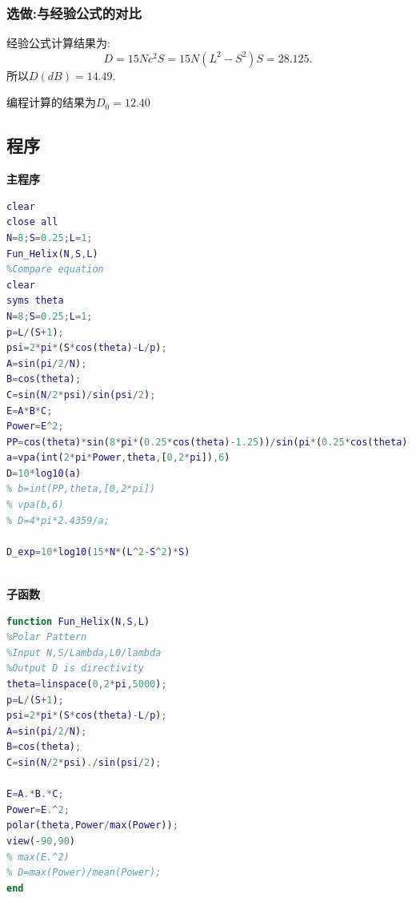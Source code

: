 \subsubsection{选做:与经验公式的对比}
经验公式计算结果为:
\begin{equation}
D=15Nc^2 S=15N(L^2-S^2) S=28.125.
\end{equation}
所以$D(dB)=14.49$.


编程计算的结果为$D_0=12.40$
\subsection{程序}
\noindent \textbf{主程序}
\begin{lstlisting}[language={matlab},keywordstyle=\color{blue!70},commentstyle=\color{red!50!green!50!blue!50},frame=shadowbox, rulesepcolor=\color{red!20!green!20!blue!20}] 
clear
close all
N=8;S=0.25;L=1;
Fun_Helix(N,S,L)
%Compare equation
clear
syms theta
N=8;S=0.25;L=1;
p=L/(S+1);
psi=2*pi*(S*cos(theta)-L/p);
A=sin(pi/2/N);
B=cos(theta);
C=sin(N/2*psi)/sin(psi/2);
E=A*B*C;
Power=E^2;
PP=cos(theta)*sin(8*pi*(0.25*cos(theta)-1.25))/sin(pi*(0.25*cos(theta)-1.225));
a=vpa(int(2*pi*Power,theta,[0,2*pi]),6)
D=10*log10(a)
% b=int(PP,theta,[0,2*pi])
% vpa(b,6)
% D=4*pi*2.4359/a;

D_exp=10*log10(15*N*(L^2-S^2)*S)



\end{lstlisting}
\noindent \textbf{子函数}
\begin{lstlisting}[language={matlab},keywordstyle=\color{blue!70},commentstyle=\color{red!50!green!50!blue!50},frame=shadowbox, rulesepcolor=\color{red!20!green!20!blue!20}] 
function Fun_Helix(N,S,L)
%Polar Pattern
%Input N,S/Lambda,L0/lambda
%Output D is directivity
theta=linspace(0,2*pi,5000);
p=L/(S+1);
psi=2*pi*(S*cos(theta)-L/p);
A=sin(pi/2/N);
B=cos(theta);
C=sin(N/2*psi)./sin(psi/2);

E=A.*B.*C;
Power=E.^2;
polar(theta,Power/max(Power));
view(-90,90)
% max(E.^2)
% D=max(Power)/mean(Power);
end
\end{lstlisting}
